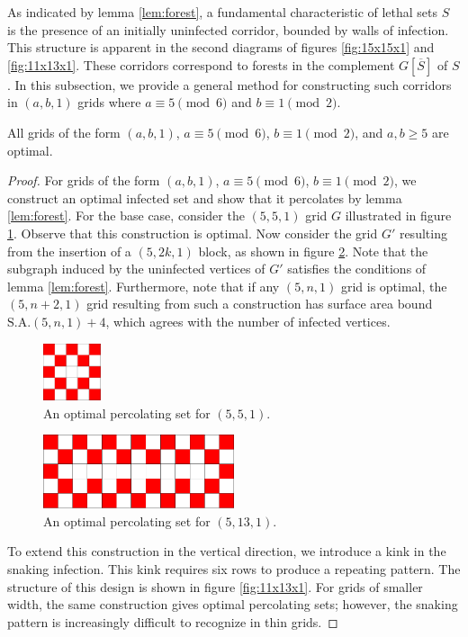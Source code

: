 As indicated by lemma \ref{lem:forest}, a fundamental characteristic of lethal sets $S$ is the presence of an initially uninfected corridor, bounded by walls of infection. This structure is apparent in the second diagrams of figures \ref{fig:15x15x1} and \ref{fig:11x13x1}. These corridors correspond to forests in the complement $G[\overline{S}]$ of $S$. In this subsection, we provide a general method for constructing such corridors in $(a, b, 1)$ grids where $a \equiv 5 \pmod 6$ and $b \equiv 1 \pmod 2$.

\begin{con}
\label{con:snake}
All grids of the form $(a,b,1)$, $a \equiv 5 \pmod 6$, $b \equiv 1 \pmod 2$, and $a,b \geq 5$ are optimal.
\end{con}

\begin{proof}
For grids of the form $(a,b,1)$, $a \equiv 5 \pmod 6$, $b \equiv 1 \pmod 2$, we construct an optimal infected set and show that it percolates by lemma \ref{lem:forest}. For the base case, consider the $(5,5,1)$ grid $G$ illustrated in figure \ref{fig:5x5x1}. Observe that this construction is optimal. Now consider the grid $G'$ resulting from the insertion of a $(5, 2k, 1)$ block, as shown in figure \ref{fig:5x13x1}. Note that the subgraph induced by the uninfected vertices of $G'$ satisfies the conditions of lemma \ref{lem:forest}. Furthermore, note that if any $(5, n, 1)$ grid is optimal, the $(5,n+2,1)$ grid resulting from such a construction has surface area bound $\text{S.A.}(5,n,1) + 4$, which agrees with the number of infected vertices.

\begin{figure}[]
\centering
\includegraphics[width=0.15\textwidth]{figures/7/5x5x1.pdf}
\caption{An optimal percolating set for $(5,5,1)$.}
\label{fig:5x5x1}
\end{figure} 

\begin{figure}[]
\centering
\includegraphics[width=0.5\textwidth]{figures/7/5x13x1.pdf}
\caption{An optimal percolating set for $(5,13,1)$.}
\label{fig:5x13x1}
\end{figure} 

To extend this construction in the vertical direction, we introduce a kink in the snaking infection. This kink requires six rows to produce a repeating pattern. The structure of this design is shown in figure \ref{fig:11x13x1}. For grids of smaller width, the same construction gives optimal percolating sets; however, the snaking pattern is increasingly difficult to recognize in thin grids.
\end{proof}

